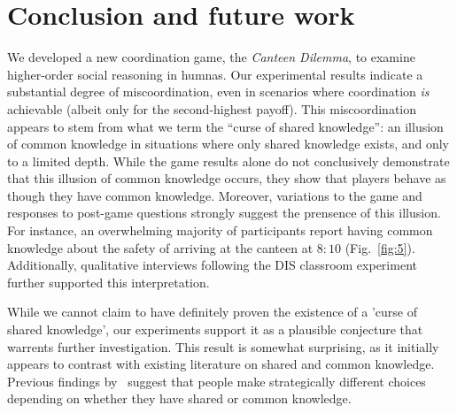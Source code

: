 \section{Conclusion and future work} \label{S:conclusion}
We developed a new coordination game, the \emph{Canteen Dilemma}, to examine higher-order social reasoning in humnas. Our experimental results %
indicate a substantial degree of miscoordination, even in scenarios where coordination \emph{is} achievable (albeit only for the second-highest payoff). This miscoordination appears to stem from what we term the ``curse of shared knowledge'': an illusion of common knowledge in situations where only shared knowledge exists, and only to a limited depth. While the game results alone do not conclusively demonstrate that this illusion of common knowledge occurs, they show that players behave as though they have common knowledge. Moreover, variations to the game and responses to post-game questions strongly suggest the prensence of this illusion. For instance, an overwhelming majority of participants report having common knowledge about the safety of arriving at the canteen at $8{:}10$ (Fig.~\ref{fig:5}). Additionally, qualitative interviews following the DIS classroom experiment further supported this interpretation. 

While we cannot claim to have definitely proven the existence of a 'curse of shared knowledge', our experiments support it as a plausible conjecture that warrents further investigation. This result is somewhat surprising, as it initially appears to contrast with existing literature on shared and common knowledge. 
Previous findings by~\cite{lee2010rationales, thomas2014psychology, thomas2016recursive, thomas2018common, de2019common, de2019maimonides} suggest that people make strategically different choices depending on whether they have shared or common knowledge. 


